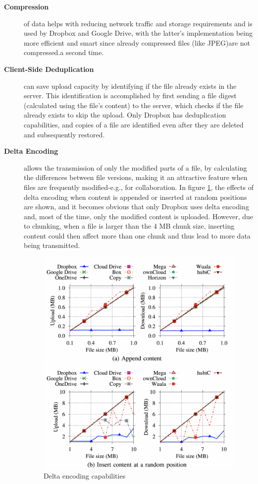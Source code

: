 \begin{description}
    \item[\textbf{Compression}] of data helps with reducing network traffic and storage requirements and is used by Dropbox and Google Drive, with the latter's implementation being more efficient and smart since already compressed files (like JPEG)are not compressed.a second time.

    \item[\textbf{Client-Side Deduplication}] can save upload capacity by identifying if the file already exists in the server. This identification is accomplished by first sending a file digest (calculated using the file's content) to the server, which checks if the file already exists to skip the upload.  Only Dropbox has deduplication capabilities, and copies of a file are identified even after they are deleted and subsequently restored.

    \item[\textbf{Delta Encoding}] allows the transmission of only the modified parts of a file, by calculating the differences between file versions, making it an attractive feature when files are frequently modified-e.g., for collaboration.  In figure  \ref{fig:delta encoding}, the effects of delta encoding when content is appended or inserted at random positions are shown, and it becomes obvious that only Dropbox uses delta encoding and, most of the time, only the modified content is uploaded. However, due to chunking, when a file is larger than the 4 MB chunk size, inserting content could then affect more than one chunk and thus lead to more data being transmitted.

        \begin{figure} [h]
        \centering
        \includegraphics[scale=0.7]{images/delta_encoding}
        \caption{\label{fig:delta encoding}Delta encoding capabilities}
    \end{figure}


\end{description}
